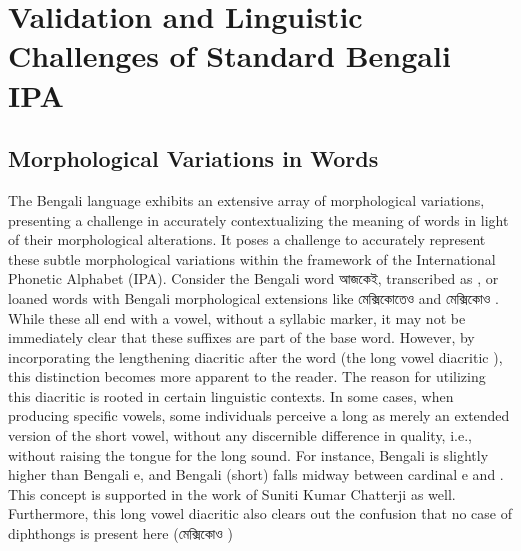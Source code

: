 \chapter{Validation and Linguistic Challenges of Standard Bengali IPA}

\section{Morphological Variations in Words}
The Bengali language exhibits an extensive array of morphological variations, presenting a challenge in accurately contextualizing the meaning of words in light of their morphological alterations. It poses a challenge to accurately represent these subtle morphological variations within the framework of the International Phonetic Alphabet (IPA). 
Consider the Bengali word \textbengali{আজকেই}, transcribed as , or loaned words with Bengali morphological extensions like \textbengali{মেক্সিকোতেও}  and \textbengali{মেক্সিকোও} . While these all end with a vowel, without a syllabic marker, it may not be immediately clear that these suffixes are part of the base word. However, by incorporating the lengthening diacritic after the word (the long vowel diacritic ), this distinction becomes more apparent to the reader.
The reason for utilizing this diacritic is rooted in certain linguistic contexts. In some cases, when producing specific vowels, some individuals perceive a long  as merely an extended version of the short vowel, without any discernible difference in quality, i.e., without raising the tongue for the long sound. For instance, Bengali  is slightly higher than Bengali e, and Bengali  (short) falls midway between cardinal e and . This concept is supported in the work of Suniti Kumar Chatterji as well. Furthermore, this long vowel diacritic also clears out the confusion that no case of diphthongs is present here (\textbengali{মেক্সিকোও} )

\begin{table}[!ht]
    \centering
    \caption{Phonetic Transcription of morphological suffixes}
\end{table}

